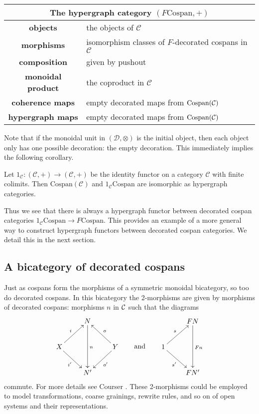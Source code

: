 \begin{center}
  \begin{tabular}{| c | p{} |}
    \hline
    \multicolumn{2}{|c|}{The hypergraph category $(F\mathrm{Cospan},+)$} \\
    \hline
    \textbf{objects} & the objects of $\mathcal C$ \\ 
    \textbf{morphisms} & isomorphism classes of $F$-decorated cospans in
    $\mathcal C$\\ 
    \textbf{composition} & given by pushout \\
    \textbf{monoidal product} & the coproduct in $\mathcal C$ \\
    \textbf{coherence maps} & empty decorated maps from $\operatorname{{Cospan}}(\mathcal C)$ \\
    \textbf{hypergraph maps} & empty decorated maps from $\operatorname{{Cospan}}(\mathcal C)$ \\
    \hline
  \end{tabular}
\end{center}

Note that if the monoidal unit in $(\mathcal D,\otimes)$ is the initial object,
then each object only has one possible decoration: the empty decoration. This
immediately implies the following corollary.
\begin{corollary}
  Let $1_{\mathcal C}\colon (\mathcal C,+) \to (\mathcal C,+)$ be the identity functor
  on a category $\mathcal C$ with finite colimits. Then
  $\mathrm{Cospan}(\mathcal C)$ and $1_{\mathcal C}\mathrm{Cospan}$ are
  isomorphic as hypergraph categories.
\end{corollary}

Thus we see that there is always a hypergraph functor between decorated cospan
categories $1_{\mathcal C}\mathrm{Cospan} \rightarrow F\mathrm{Cospan}$. This
provides an example of a more general way to construct hypergraph functors
between decorated cospan categories. We detail this in the next section.

\subsection{A bicategory of decorated cospans}
Just as cospans form the morphisms of a symmetric monoidal bicategory, so too do
decorated cospans. In this bicategory the 2-morphisms are given by morphisms of
decorated cospans: morphisms $n$
in $\mathcal C$ such that the diagrams
\[
  \begin{aligned}
    \xymatrix{
      & N \ar[dd]^n \\  
      X \ar[ur]^{i} \ar[dr]_{i'} && Y \ar[ul]_{o} \ar[dl]^{o'}\\
      & N'
    }
  \end{aligned}
  \qquad \mbox{and}
  \qquad
  \begin{aligned}
    \xymatrix{
      & FN \ar[dd]^{Fn} \\
      1 \ar[ur]^{s} \ar[dr]_{s'} \\
      & FN'
    }
  \end{aligned}
\]
commute. For more details see Courser \cite{Cou16}. These 2-morphisms could be
employed to model transformations, coarse grainings, rewrite rules, and so on of
open systems and their representations.


